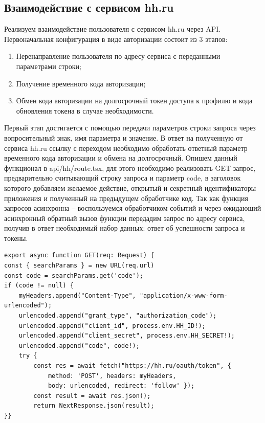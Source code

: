 \documentclass[master, och, pract]{SCWorks}
\begin{document}
\subsection{Взаимодействие с сервисом hh.ru}
Реализуем взаимодействие пользователя с сервисом hh.ru через API. Первоначальная конфигурация в виде авторизации состоит из 3 этапов:
\begin{enumerate}
    \item Перенаправление пользователя по адресу сервиса с переданными параметрами строки;
    \item Получение временного кода авторизации;
    \item Обмен кода авторизации на долгосрочный токен доступа к профилю и кода обновления токена в случае необходимости.\cite{hh_api}
\end{enumerate}

Первый этап достигается с помощью передачи параметров строки запроса через вопросительный знак, имя параметра и значение. В ответ на полученную от сервиса hh.ru ссылку с переходом необходимо обработать ответный параметр временного кода авторизации и обмена на долгосрочный. Опишем данный функционал в api/hh/route.tsx, для этого необходимо реализовать GET запрос, предварительно считывающий строку запроса и параметр code, в заголовок которого добавляем желаемое действие, открытый и секретный идентификаторы приложения и полученный на предыдущем обработчике код. Так как функция запросов асинхронна – воспользуемся обработчиком событий и через ожидающий асинхронный обратный вызов функции передадим запрос по адресу сервиса, получив в ответ необходимый набор данных: ответ об успешности запроса и токены\cite{Razin_2020}.
\begin{verbatim}
export async function GET(req: Request) {
const { searchParams } = new URL(req.url)
const code = searchParams.get('code');
if (code != null) {
    myHeaders.append("Content-Type", "application/x-www-form-urlencoded");
    urlencoded.append("grant_type", "authorization_code");
    urlencoded.append("client_id", process.env.HH_ID!);
    urlencoded.append("client_secret", process.env.HH_SECRET!);
    urlencoded.append("code", code!);
    try {
        const res = await fetch("https://hh.ru/oauth/token", {
            method: 'POST', headers: myHeaders,
            body: urlencoded, redirect: 'follow' });   
        const result = await res.json();
        return NextResponse.json(result);
}} 
\end{verbatim}
\end{document}
